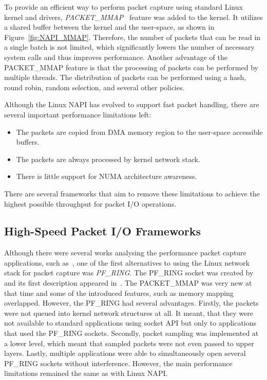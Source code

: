 To provide an efficient way to perform packet capture using standard Linux kernel and drivers, \emph{PACKET\_MMAP}~\cite{LinuxKernelOrganization-2017-PACKETMMAP} feature was added to the kernel. It utilizes a shared buffer between the kernel and the user-space, as shown in Figure~\ref{fig:NAPI_MMAP}. Therefore, the number of packets that can be read in a single batch is not limited, which significantly lowers the number of necessary system calls and thus improves performance. Another advantage of the PACKET\_MMAP feature is that the processing of packets can be performed by multiple threads. The distribution of packets can be performed using a hash, round robin, random selection, and several other policies. 

Although the Linux NAPI has evolved to support fast packet handling, there are several important performance limitations left:
\begin{itemize}
  \item The packets are copied from DMA memory region to the user-space accessible buffers.
  \item The packets are always processed by kernel network stack.
  \item There is little support for NUMA architecture awareness.
\end{itemize}

There are several frameworks that aim to remove these limitations to achieve the highest possible throughput for packet I/O operations.


\subsection{High-Speed Packet I/O Frameworks}

Although there were several works analysing the performance packet capture applications, such as~\cite{Degioanni-2003-Profiling}, one of the first alternatives to using the Linux network stack for packet capture was \emph{PF\_RING}. The PF\_RING socket was created by \citeauthor{Deri-2004-Improving} and its first description appeared in~\cite{Deri-2004-Improving}. The PACKET\_MMAP was very new at that time and some of the introduced features, such as memory mapping overlapped. However, the PF\_RING had several advantages. Firstly, the packets were not queued into kernel network structures at all. It meant, that they were not available to standard applications using socket API but only to applications that used the PF\_RING sockets. Secondly, packet sampling was implemented at a lower level, which meant that sampled packets were not even passed to upper layers. Lastly, multiple applications were able to simultaneously open several PF\_RING sockets without interference. However, the main performance limitations remained the same as with Linux NAPI.

